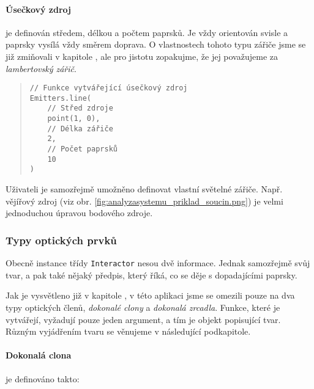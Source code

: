 
\paragraph{Úsečkový zdroj} je definován středem, délkou a počtem paprsků. Je vždy orientován svisle a paprsky vysílá vždy směrem doprava. O vlastnostech tohoto typu zářiče jsme se již zmiňovali v kapitole , ale pro jistotu zopakujme, že jej považujeme za \emph{lambertovský zářič}.\src

\begin{minipage}{\textwidth}\begin{quote}\begin{lstlisting}
// Funkce vytvářející úsečkový zdroj
Emitters.line(
    // Střed zdroje
    point(1, 0),
    // Délka zářiče
    2,
    // Počet paprsků
    10
)
\end{lstlisting}\end{quote}\end{minipage}


Uživateli je samozřejmě umožněno definovat vlastní světelné zářiče. Např. vějířový zdroj (viz obr. \ref{fig:analyzasystemu_priklad_soucin.png}) je velmi jednoduchou úpravou bodového zdroje.


\subsubsection{Typy optických prvků}

Obecně instance třídy \texttt{Interactor} nesou dvě informace. Jednak samozřejmě svůj tvar, a pak také nějaký předpis, který říká, co se děje s dopadajícími paprsky.

Jak je vysvětleno již v kapitole , v této aplikaci jsme se omezili pouze na dva typy optických členů, \emph{dokonalé clony} a \emph{dokonalá zrcadla}. Funkce, které je vytvářejí, vyžadují pouze jeden argument, a tím je objekt popisující tvar. Různým vyjádřením tvaru se věnujeme v následující podkapitole.

\paragraph{Dokonalá clona} je definováno takto:

